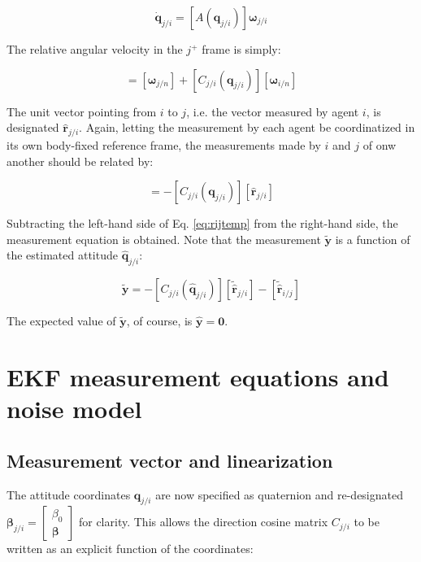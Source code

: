 \documentclass{aiaa-tc}
\newcommand{\fr}[1]{$#1^+$} %
\newcommand{\B}[1]{\textbf{#1}} %
\newcommand{\U}[1]{\hat{\textbf{#1}}} %
\newcommand{\BG}[1]{{\bm #1}}           %
\begin{document}
\begin{equation}
\dot{\B{q}}_{j/i} = [A(\B{q}_{j/i})]\BG{\omega}_{j/i}
\label{eq:qji}
\end{equation}

The relative angular velocity in the \fr{j} frame is simply:

\begin{equation}
[\BG{\omega}_{j/i}] = [\BG{\omega}_{j/n}] + [C_{j/i}(\B{q}_{j/i})][\BG{\omega}_{i/n}]
\label{eq:omegaji}
\end{equation}

The unit vector pointing from $i$ to $j$, i.e. the vector measured by agent $i$, is designated $\U{r}_{j/i}$. Again, letting the measurement by each agent be coordinatized in its own body-fixed reference frame, the measurements made by $i$ and $j$ of onw another should be related by:

\begin{equation}
[\U{r}_{i/j}] = -[C_{j/i}(\B{q}_{j/i})][\U{r}_{j/i}]
\label{eq:rijtemp}
\end{equation}

Subtracting the left-hand side of Eq. \ref{eq:rijtemp} from the right-hand side, the measurement equation is obtained. Note that the measurement $\tilde{\B{y}}$ is a function of the estimated attitude $\hat{\B{q}}_{j/i}$:

\begin{equation}
\tilde{\B{y}} = -[C_{j/i}(\hat{\B{q}}_{j/i})][\tilde{\U{r}}_{j/i}] - [\tilde{\U{r}}_{i/j}]
\label{eq:ytilde}
\end{equation}

The expected value of $\tilde{\B{y}}$, of course, is $\hat{\B{y}} = \B{0}$.

\section{ EKF measurement equations and noise model }

\subsection{Measurement vector and linearization}

The attitude coordinates $\B{q}_{j/i}$ are now specified as quaternion and re-designated $\BG{\beta}_{j/i} = \begin{bmatrix}
\beta_0 \\
\BG{\beta}
\end{bmatrix}$ for clarity. This allows the direction cosine matrix $C_{j/i}$ to be written as an explicit function of the coordinates:
\end{document}
